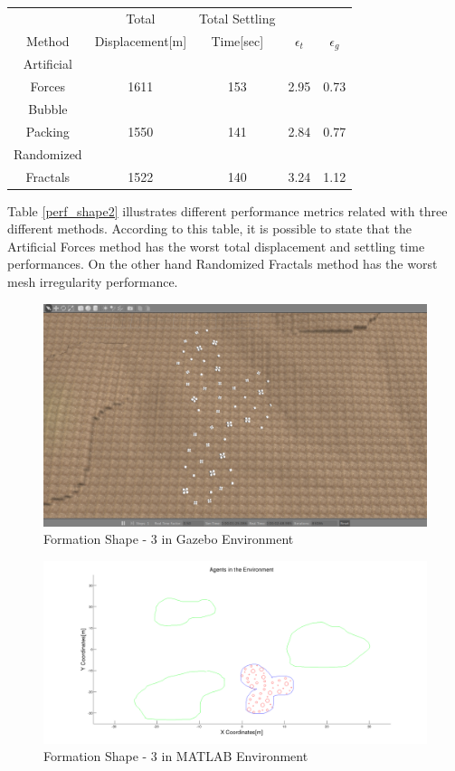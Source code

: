 \newpage		 
\begin{center}
 \label{perf_shape2} 
\begin{tabular}{|c|c|c|c|c|}
					
\hline
& Total  & Total Settling &  &\\ Method & Displacement[m] & Time[sec]& \textbf{$\epsilon_t$} & \textbf{$\epsilon_g$} \\
\hline
Artificial&  &  &  & \\
 Forces & 1611 & 153& 2.95 & 0.73\\
 \hline
 Bubble&  &  &  & \\
 Packing &1550 &141 &2.84 & 0.77\\
\hline
 Randomized&  &  &  & \\
 Fractals &1522 &140 &3.24 & 1.12\\
\hline
\end{tabular}
\end{center}
		 		
Table \ref{perf_shape2} illustrates different performance metrics related with three different methods. According to this table, it is possible to state that the Artificial Forces method has the worst total displacement and settling time performances. On the other hand Randomized Fractals method has the worst mesh irregularity performance.
		 
\begin{figure}[H]
\caption{Formation Shape - 3 in Gazebo Environment}
\centerline{\includegraphics[scale = 0.32]{3_Gazebo}}
\end{figure} 
				 
\begin{figure}[H]
\caption{Formation Shape - 3 in MATLAB Environment}
\centerline{\includegraphics[scale = 0.32]{3}}
\end{figure} 			 
			
